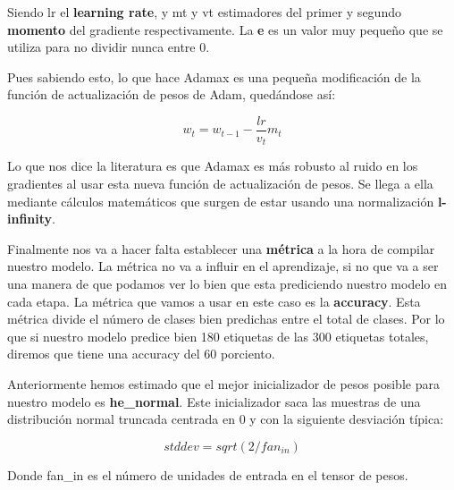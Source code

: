 Siendo lr el \textbf{learning rate}, y mt y vt estimadores del primer y segundo \textbf{momento} del gradiente respectivamente. La \textbf{e} es un valor muy pequeño que se utiliza para no dividir nunca entre 0.

\vspace{5 mm}

Pues sabiendo esto, lo que hace Adamax es una pequeña modificación de la función de actualización de pesos de Adam, quedándose así:

\[w_t = w_{t-1} - \frac{lr}{v_t} m_t   \] 

Lo que nos dice la literatura es que Adamax es más robusto al ruido en los gradientes al usar esta nueva función de actualización de pesos. Se llega a ella mediante cálculos matemáticos que surgen de estar usando una normalización \textbf{l-infinity}.

\vspace{5 mm}	

Finalmente nos va a hacer falta establecer una \textbf{métrica} a la hora de compilar nuestro modelo. La métrica no va a influir en el aprendizaje, si no que va a ser una manera de que podamos ver lo bien que esta prediciendo nuestro modelo en cada etapa. La métrica que vamos a usar en este caso es la \textbf{accuracy}. Esta métrica divide el número de clases bien predichas entre el total de clases. Por lo que si nuestro modelo predice bien 180 etiquetas de las 300 etiquetas totales, diremos que tiene una accuracy del 60 porciento.

\vspace{5 mm}

Anteriormente hemos estimado que el mejor inicializador de pesos posible para nuestro modelo es \textbf{he\_normal}. Este inicializador saca las muestras de una distribución normal truncada centrada en 0 y con la siguiente desviación típica:

\[stddev = sqrt(2 / fan_{in})\]

Donde fan\_in es el número de unidades de entrada en el tensor de pesos.